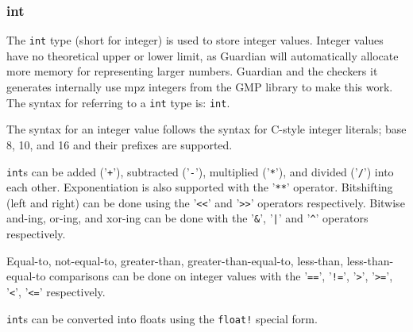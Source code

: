 
\subsubsection{int}
{
	The \texttt{int} type (short for integer) is used to store integer values.
	Integer values have no theoretical upper or lower limit, as Guardian will
	automatically allocate more memory for representing larger numbers.
	Guardian and the checkers it generates internally
	use mpz integers from the GMP library to make this
	work.
	The syntax for referring to a \texttt{int} type is: \texttt{int}.
	
	The syntax for an integer value follows the syntax for C-style integer
	literals; base 8, 10, and 16 and their prefixes are supported.
	
	\texttt{int}s can be added ('\texttt{+}'),
	subtracted ('\texttt{-}'), multiplied ('\texttt{*}'), and
	divided ('\texttt{/}') into each
	other. Exponentiation is also supported
	with the '\texttt{**}' operator. Bitshifting (left and right) can be done
	using the '\texttt{<<}' and '\texttt{>>}' operators respectively.
	Bitwise and-ing, or-ing, and xor-ing can be done with the '\texttt{\&}',
	'\texttt{|}' and '\texttt{\^}' operators respectively.
	
	Equal-to, not-equal-to, greater-than, greater-than-equal-to,
	less-than, less-than-equal-to comparisons can be done on integer values with
	the '\texttt{==}', '\texttt{!=}',
	'\texttt{>}', '\texttt{>=}', '\texttt{<}', '\texttt{<=}' respectively.
	
	\texttt{int}s can be converted into floats using the \texttt{float!}
	special form.
}
